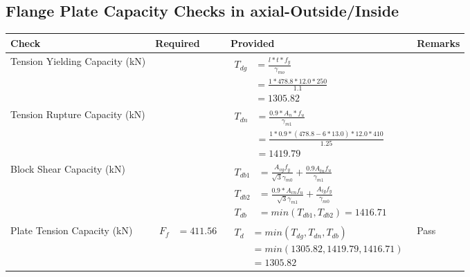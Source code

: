 \documentclass{article}%
\begin{document}
\subsection{Flange Plate Capacity Checks in axial{-}Outside/Inside }%
\label{subsec:FlangePlateCapacityChecksinaxial{-}Outside/Inside}%
\renewcommand{\arraystretch}{1.2}%
\begin{longtable}{|p{4cm}|p{4cm}|p{7cm}|p{1.5cm}|}%
\hline%
\rowcolor{OsdagGreen}%
Check&Required&Provided&Remarks\\%
\hline%
\endhead%
\hline%
Tension Yielding Capacity (kN)&&$\begin{aligned} T_{dg} &= \frac{l*t*f_y}{\gamma_{mo}}\\ &=\frac{1*478.8*12.0*250}{1.1}\\ &=1305.82\end{aligned}$&\\%
\hline%
Tension Rupture Capacity (kN)&&$\begin{aligned} T_{dn} &= \frac{0.9*A_{n}*f_u}{\gamma_{m1}}\\ &=\frac{1*0.9* (478.8-6*13.0)*12.0*410}{1.25}\\ &=1419.79\end{aligned}$&\\%
\hline%
Block Shear Capacity (kN)&&$\begin{aligned}T_{db1} &= \frac{A_{vg} f_{y}}{\sqrt{3} \gamma_{m0}} + \frac{0.9 A_{tn} f_{u}}{\gamma_{m1}}\\ T_{db2} &= \frac{0.9*A_{vn} f_{u}}{\sqrt{3} \gamma_{m1}} + \frac{A_{tg} f_{y}}{\gamma_{m0}}\\ T_{db} &= min(T_{db1}, T_{db2})= 1416.71\end{aligned}$&\\%
\hline%
Plate Tension Capacity (kN)&$\begin{aligned} F_f &=411.56\end{aligned}$&$\begin{aligned} T_d &= min(T_{dg},T_{dn},T_{db})\\ &= min(1305.82,1419.79,1416.71)\\ &=1305.82\end{aligned}$&Pass\\%
\hline%
\end{longtable}

%
\newpage%
\end{document}
